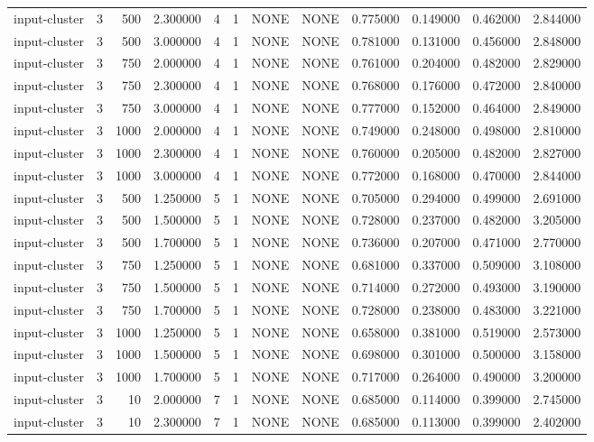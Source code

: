 \begin{tabular}{lrrrllllrrrr}
input-cluster & 3 & 500 & 2.300000 & 4 & 1 & NONE & NONE & 0.775000 & 0.149000 & 0.462000 & 2.844000 \\
input-cluster & 3 & 500 & 3.000000 & 4 & 1 & NONE & NONE & 0.781000 & 0.131000 & 0.456000 & 2.848000 \\
input-cluster & 3 & 750 & 2.000000 & 4 & 1 & NONE & NONE & 0.761000 & 0.204000 & 0.482000 & 2.829000 \\
input-cluster & 3 & 750 & 2.300000 & 4 & 1 & NONE & NONE & 0.768000 & 0.176000 & 0.472000 & 2.840000 \\
input-cluster & 3 & 750 & 3.000000 & 4 & 1 & NONE & NONE & 0.777000 & 0.152000 & 0.464000 & 2.849000 \\
input-cluster & 3 & 1000 & 2.000000 & 4 & 1 & NONE & NONE & 0.749000 & 0.248000 & 0.498000 & 2.810000 \\
input-cluster & 3 & 1000 & 2.300000 & 4 & 1 & NONE & NONE & 0.760000 & 0.205000 & 0.482000 & 2.827000 \\
input-cluster & 3 & 1000 & 3.000000 & 4 & 1 & NONE & NONE & 0.772000 & 0.168000 & 0.470000 & 2.844000 \\
input-cluster & 3 & 500 & 1.250000 & 5 & 1 & NONE & NONE & 0.705000 & 0.294000 & 0.499000 & 2.691000 \\
input-cluster & 3 & 500 & 1.500000 & 5 & 1 & NONE & NONE & 0.728000 & 0.237000 & 0.482000 & 3.205000 \\
input-cluster & 3 & 500 & 1.700000 & 5 & 1 & NONE & NONE & 0.736000 & 0.207000 & 0.471000 & 2.770000 \\
input-cluster & 3 & 750 & 1.250000 & 5 & 1 & NONE & NONE & 0.681000 & 0.337000 & 0.509000 & 3.108000 \\
input-cluster & 3 & 750 & 1.500000 & 5 & 1 & NONE & NONE & 0.714000 & 0.272000 & 0.493000 & 3.190000 \\
input-cluster & 3 & 750 & 1.700000 & 5 & 1 & NONE & NONE & 0.728000 & 0.238000 & 0.483000 & 3.221000 \\
input-cluster & 3 & 1000 & 1.250000 & 5 & 1 & NONE & NONE & 0.658000 & 0.381000 & 0.519000 & 2.573000 \\
input-cluster & 3 & 1000 & 1.500000 & 5 & 1 & NONE & NONE & 0.698000 & 0.301000 & 0.500000 & 3.158000 \\
input-cluster & 3 & 1000 & 1.700000 & 5 & 1 & NONE & NONE & 0.717000 & 0.264000 & 0.490000 & 3.200000 \\
input-cluster & 3 & 10 & 2.000000 & 7 & 1 & NONE & NONE & 0.685000 & 0.114000 & 0.399000 & 2.745000 \\
input-cluster & 3 & 10 & 2.300000 & 7 & 1 & NONE & NONE & 0.685000 & 0.113000 & 0.399000 & 2.402000 \\

\end{tabular}
